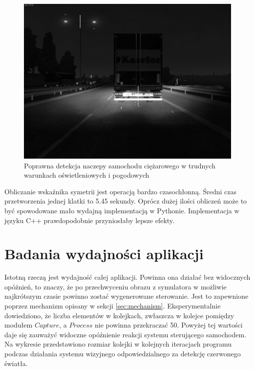 \begin{figure}
  \centering
  \includegraphics[width=13cm]{img/alg3_res3.jpg}
  \caption{Poprawna detekcja naczepy samochodu ciężarowego w trudnych warunkach oświetleniowych i pogodowych}
  \label{fig:alg3_rain_late}
\end{figure}

Obliczanie wskaźnika symetrii jest operacją bardzo czasochłonną. 
Średni czas przetworzenia jednej klatki to 5.45 sekundy. 
Oprócz dużej ilości obliczeń może to być spowodowane mało wydajną implementacją w Pythonie. 
Implementacja w języku C++ prawdopodobnie przyniosłaby lepsze efekty.


\section{Badania wydajności aplikacji}

Istotną rzeczą jest wydajność całej aplikacji. 
Powinna ona działać bez widocznych opóźnień, to znaczy, że po przechwyceniu obrazu z symulatora w możliwie najkrótszym czasie powinno zostać wygenerowane sterowanie. 
Jest to zapewnione poprzez mechanizm opisany w sekcji \ref{sec:mechanism}. %
Eksperymentalnie dowiedziono, że liczba elementów w kolejkach, zwłaszcza w kolejce pomiędzy modułem $Capture$, a $Process$ nie powinna przekraczać 50. %
Powyżej tej wartości daje się zauważyć widoczne opóźnienie reakcji systemu sterującego samochodem. 
Na wykresie przedstawiono rozmiar kolejki w kolejnych iteracjach programu podczas działania systemu wizyjnego odpowiedzialnego za detekcję czerwonego światła.

